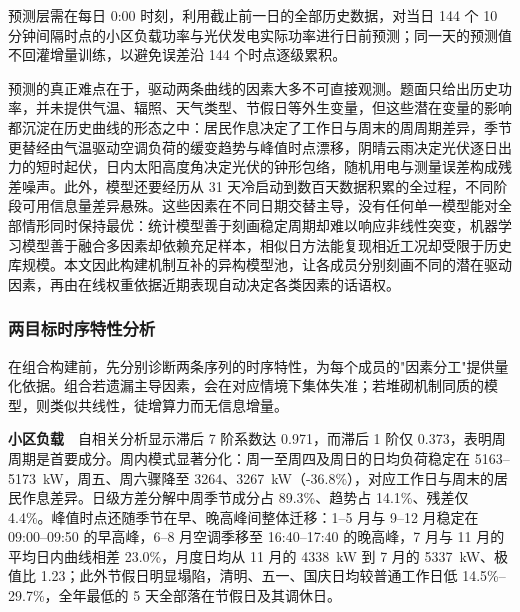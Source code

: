 


预测层需在每日 0:00 时刻，利用截止前一日的全部历史数据，对当日 144 个 10 分钟间隔时点的小区负载功率与光伏发电实际功率进行日前预测；同一天的预测值不回灌增量训练，以避免误差沿 144 个时点逐级累积。

预测的真正难点在于，驱动两条曲线的因素大多不可直接观测。题面只给出历史功率，并未提供气温、辐照、天气类型、节假日等外生变量，但这些潜在变量的影响都沉淀在历史曲线的形态之中：居民作息决定了工作日与周末的周周期差异，季节更替经由气温驱动空调负荷的缓变趋势与峰值时点漂移，阴晴云雨决定光伏逐日出力的短时起伏，日内太阳高度角决定光伏的钟形包络，随机用电与测量误差构成残差噪声。此外，模型还要经历从 31 天冷启动到数百天数据积累的全过程，不同阶段可用信息量差异悬殊。这些因素在不同日期交替主导，没有任何单一模型能对全部情形同时保持最优：统计模型善于刻画稳定周期却难以响应非线性突变，机器学习模型善于融合多因素却依赖充足样本，相似日方法能复现相近工况却受限于历史库规模。本文因此构建机制互补的异构模型池，让各成员分别刻画不同的潜在驱动因素，再由在线权重依据近期表现自动决定各类因素的话语权。

\subsubsection{两目标时序特性分析}

在组合构建前，先分别诊断两条序列的时序特性，为每个成员的"因素分工"提供量化依据。组合若遗漏主导因素，会在对应情境下集体失准；若堆砌机制同质的模型，则类似共线性，徒增算力而无信息增量。

\textbf{小区负载}\ \ 自相关分析显示滞后 7 阶系数达 0.971，而滞后 1 阶仅 0.373，表明周周期是首要成分。周内模式显著分化：周一至周四及周日的日均负荷稳定在 5163--5173~kW，周五、周六骤降至 3264、3267~kW（-36.8\%），对应工作日与周末的居民作息差异。日级方差分解中周季节成分占 89.3\%、趋势占 14.1\%、残差仅 4.4\%。峰值时点还随季节在早、晚高峰间整体迁移：1--5 月与 9--12 月稳定在 09:00--09:50 的早高峰，6--8 月空调季移至 16:40--17:40 的晚高峰，7 月与 11 月的平均日内曲线相差 23.0\%，月度日均从 11 月的 4338~kW 到 7 月的 5337~kW、极值比 1.23；此外节假日明显塌陷，清明、五一、国庆日均较普通工作日低 14.5\%--29.7\%，全年最低的 5 天全部落在节假日及其调休日。

